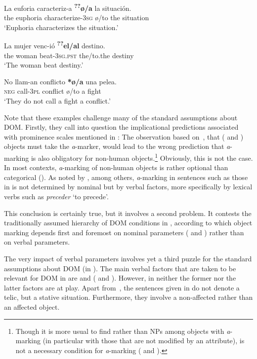 \documentclass[output=paper]{LSP/langsci}
\begin{document}
\ex \label{08-ga-ex:17c}
\gll La euforia caracteriz-a \textbf{\textsuperscript{??}}\textbf{ø/a} la situación.\\
 the euphoria characterize-3\textsc{sg} ø/to the situation\\
\glt ‘Euphoria characterizes the situation.’

\ex \label{08-ga-ex:17d}
\gll La mujer venc-ió \textbf{\textsuperscript{??}}\textbf{el/al} destino.\\
 the woman beat-3\textsc{sg.pst} the/to.the destiny\\
\glt ‘The woman beat destiny.’

\ex \label{08-ga-ex:17e}
\gll No llam-an conflicto \textbf{*ø/a} una pelea.\\
\textsc{neg} call-3\textsc{pl} conflict ø/to a fight\\
\glt ‘They do not call a fight a conflict.’
\z
\z

Note that these examples challenge many of the standard assumptions about DOM. Firstly, they call into question the implicational predictions associated with prominence scales mentioned in : The observation based on~, that ( and )  objects must take the \textit{a}-marker, would lead to the wrong prediction that \textit{a}-marking is also obligatory for  non-human objects.\footnote{Though it is more usual to find  rather than  NPs among  objects with \textit{a}-marking (in particular with those that are not modified by an attribute),  is not a necessary condition for \textit{a}-marking (\cf {} and ).} Obviously, this is not the case. In most contexts, \textit{a}-marking of  non-human objects is rather optional than categorical (\cf {}). As noted by \citet[1788]{Torrego1999Gramatica}, among others, \textit{a}-marking in sentences such as those in  is not determined by nominal but by verbal factors, more specifically by lexical verbs such as \textit{preceder} ‘to precede’. 

This conclusion is certainly true, but it involves a second problem. It contests the traditionally assumed hierarchy of DOM conditions in , according to which object marking depends first and foremost on nominal parameters ( and ) rather than on verbal parameters. 

The very impact of verbal parameters involves yet a third puzzle for the standard assumptions about DOM (in ). The main verbal factors that are taken to be relevant for DOM in  are  and  (\cf {} and ). However, in  neither the former nor the latter factors are at play. Apart from~, the sentences given in  do not denote a telic, but a stative situation. Furthermore, they involve a non-affected rather than an affected object. 
\end{document}
